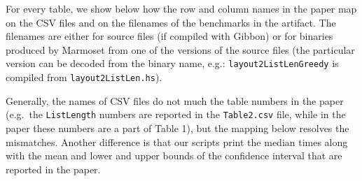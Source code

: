 For every table, we show below how the row and column names in the paper
map on the CSV files and on the filenames of the benchmarks in the
artifact. The filenames are either for source files (if compiled with
Gibbon) or for binaries produced by Marmoset from one of the versions of
the source files (the particular version can be decoded from the binary
name, e.g.: \texttt{layout2ListLenGreedy} is compiled from
\texttt{layout2ListLen.hs}).

Generally, the names of CSV files do not much the table numbers in the
paper (e.g.~the \texttt{ListLength} numbers are reported in the
\texttt{Table2.csv} file, while in the paper these numbers are a part of
Table 1), but the mapping below resolves the mismatches. Another
difference is that our scripts print the median times along with the
mean and lower and upper bounds of the confidence interval that are
reported in the paper.

